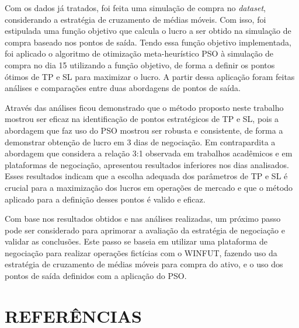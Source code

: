 \documentclass{iftex2024}
\begin{document}
Com os dados já tratados, foi feita uma simulação de compra
no \textit{dataset}, considerando a estratégia de cruzamento de médias móveis. Com isso, foi
estipulada uma função objetivo que calcula o lucro a ser obtido na simulação de compra
baseado nos pontos de saída. Tendo essa função objetivo implementada, foi aplicado o
algoritmo de otimização meta-heurístico PSO à simulação de compra no dia 15 utilizando
a função objetivo, de forma a definir os pontos ótimos de TP e SL para maximizar o
lucro. A partir dessa aplicação foram feitas análises e comparações entre duas
abordagens de pontos de saída.

Através das análises ficou demonstrado que o método proposto neste trabalho mostrou ser eficaz na
identificação de pontos estratégicos de TP e SL, pois a abordagem que faz uso do PSO
mostrou ser robusta e consistente, de forma a demonstrar obtenção de lucro em 3
dias de negociação. Em contrapardita a abordagem que considera a relação 3:1 observada em trabalhos acadêmicos e
em plataformas de negociação, apresentou resultados inferiores nos dias analisados.
Esses resultados indicam que a escolha adequada dos parâmetros de TP e SL é crucial
para a maximização dos lucros em operações de mercado e que o método aplicado para a
definição desses pontos é valido e eficaz.

Com base nos resultados obtidos e nas análises realizadas, um próximo passo
pode ser considerado para aprimorar a avaliação da estratégia de negociação e validar as
conclusões. Este passo se baseia em utilizar uma plataforma de negociação para realizar
operações fictícias com o WINFUT, fazendo uso da estratégia
de cruzamento de médias móveis para compra do ativo, e o uso dos pontos de saída
definidos com a aplicação do PSO.


\chapter*{REFERÊNCIAS}

\printbibliography
\end{document}
